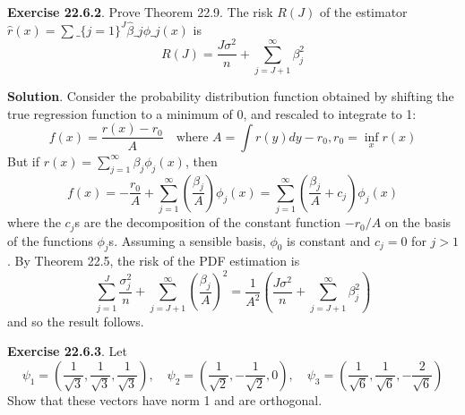 \textbf{Exercise 22.6.2}. Prove Theorem 22.9.
The risk \(R(J)\) of the estimator $ \hat{r}(x) = \sum\_\{j=1\}^{J}
\hat{\beta}\_{j} \phi\_{j}(x) $ is
\[
R(J) = \frac{J \sigma^{2}}{n} + \sum_{j=J+1}^{\infty} \beta_{j}^{2}
\]

\textbf{Solution}. Consider the probability distribution function
obtained by shifting the true regression function to a minimum of 0, and
rescaled to integrate to 1:
\[
f(x) = \frac{r(x) - r_{0}}{A} \quad \text{where } A = \int r(y) dy - r_{0}, r_{0} = \inf_x r(x)
\]
But if \(r(x) = \sum_{j=1}^{\infty} \beta_{j} \phi_{j}(x)\), then
\[
f(x) = -\frac{r_{0}}{A} + \sum_{j=1}^{\infty} \left( \frac{\beta_{j}}{A} \right) \phi_{j}(x) = \sum_{j=1}^{\infty} \left( \frac{\beta_{j}}{A} + c_{j} \right) \phi_{j}(x)
\]
where the \(c_{j}\)s are the decomposition of the constant function
\(-r_{0} / A\) on the basis of the functions \(\phi_{j}\)s. Assuming a
sensible basis, \(\phi_{0}\) is constant and \(c_{j} = 0\) for \(j > 1\).
By Theorem 22.5, the risk of the PDF estimation is
\[
\sum_{j=1}^J \frac{\sigma_{j}^{2}}{n} + \sum_{j=J+1}^{\infty} \left( \frac{\beta_{j}}{A} \right)^{2} = \frac{1}{A^{2}} \left( \frac{J \sigma^{2}}{n} + \sum_{j=J+1}^{\infty} \beta_{j}^{2} \right)
\]
and so the result follows.

\textbf{Exercise 22.6.3}. Let
\[
\psi_{1} = \left( \frac{1}{\sqrt{3}}, \frac{1}{\sqrt{3}} , \frac{1}{\sqrt{3}} \right),
\quad
\psi_{2} = \left( \frac{1}{\sqrt{2}}, -\frac{1}{\sqrt{2}} , 0 \right),
\quad
\psi_{3} = \left( \frac{1}{\sqrt{6}}, \frac{1}{\sqrt{6}} , -\frac{2}{\sqrt{6}} \right)
\]
Show that these vectors have norm 1 and are orthogonal.

